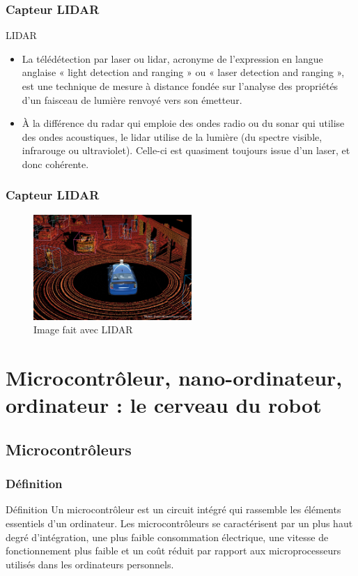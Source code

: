 \documentclass{beamer}
\begin{document}
\begin{frame}
  \frametitle{Capteur LIDAR}
  \begin{block}{LIDAR}
  \begin{itemize}
  \item La télédétection par laser ou lidar, acronyme de l'expression en langue anglaise « light detection and ranging » ou « laser detection and ranging », est une technique de mesure à distance fondée sur l'analyse des propriétés d'un faisceau de lumière renvoyé vers son émetteur.
  \item À la différence du radar qui emploie des ondes radio ou du sonar qui utilise des ondes acoustiques, le lidar utilise de la lumière (du spectre visible, infrarouge ou ultraviolet). Celle-ci est quasiment toujours issue d’un laser, et donc cohérente.
  \end{itemize}
  \end{block}
\end{frame}

\begin{frame}
  \frametitle{Capteur LIDAR}
  \begin{figure}[!h]
  \centering
  \includegraphics[width=6cm]{lidar_selfdrivingcar.png}
  \caption{Image fait avec LIDAR}
  \end{figure}
\end{frame}




\section{Microcontrôleur, nano-ordinateur, ordinateur : le cerveau du robot}
\subsection{Microcontrôleurs}
\begin{frame}
\frametitle{Définition}
\begin{block}{Définition}
Un microcontrôleur est un circuit intégré qui rassemble les éléments essentiels d'un ordinateur.
 Les microcontrôleurs se caractérisent par un plus haut degré d'intégration, une plus faible consommation électrique, une vitesse de fonctionnement plus faible  et un coût réduit par rapport aux microprocesseurs  utilisés dans les ordinateurs personnels. 
\end{block}
\end{frame}
\end{document}
